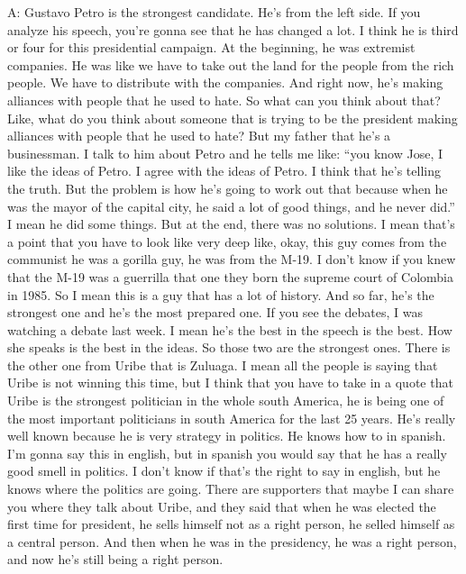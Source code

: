 \documentclass{phyasgn}\usepackage{nag}
\begin{document}
A: Gustavo Petro is the strongest candidate. He's from the left side. If you analyze his speech, you're gonna see that he has changed a lot. I think he is third or four for this presidential campaign. At the beginning, he was extremist companies. He was like we have to take out the land for the people from the rich people. We have to distribute with the companies. And right now, he's making alliances with people that he used to hate. So what can you think about that? Like, what do you think about someone that is trying to be the president making alliances with people that he used to hate? But my father that he's a businessman. I talk to him about Petro and he tells me like: “you know Jose, I like the ideas of Petro. I agree with the ideas of Petro. I think that he's telling the truth. But the problem is how he's going to work out that because when he was the mayor of the capital city, he said a lot of good things, and he never did.” I mean he did some things. But at the end, there was no solutions. I mean that's a point that you have to look like very deep like, okay, this guy comes from the communist he was a gorilla guy, he was from the M-19. I don't know if you knew that the M-19 was a guerrilla that one they born the supreme court of Colombia in 1985. So I mean this is a guy that has a lot of history. And so far, he's the strongest one and he's the most prepared one. If you see the debates, I was watching a debate last week. I mean he's the best in the speech is the best. How she speaks is the best in the ideas. So those two are the strongest ones. There is the other one from Uribe that is Zuluaga. I mean all the people is saying that Uribe is not winning this time, but I think that you have to take in a quote that Uribe is the strongest politician in the whole south America, he is being one of the most important politicians in south America for the last 25 years. He's really well known because he is very strategy in politics. He knows how to in spanish. I'm gonna say this in english, but in spanish you would say that he has a really good smell in politics. I don't know if that's the right to say in english, but he knows where the politics are going. There are supporters that maybe I can share you where they talk about Uribe, and they said that when he was elected the first time for president, he sells himself not as a right person, he selled himself as a central person. And then when he was in the presidency, he was a right person, and now he's still being a right person.\\
\\
\end{document}
